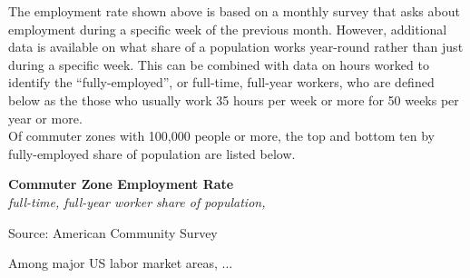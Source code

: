 \documentclass{report}
\begin{document}
{{{{\begin{minipage}{0.76\textwidth}
\vspace{4mm}

\small The employment rate shown above is based on a monthly survey that asks about employment during a specific week of the previous month. However, additional data is available on what share of a population works year-round rather than just during a specific week. This can be combined with data on hours worked to identify the ``fully-employed'', or full-time, full-year workers, who are defined below as the those who usually work 35 hours per week or more for 50 weeks per year or more.\\

 Of commuter zones with 100,000 people or more, the top and bottom ten by fully-employed share of population are listed below.
\end{minipage}

\vspace{3mm}

\begin{minipage}{0.52\textwidth}


\noindent \normalsize \textbf{Commuter Zone Employment Rate}\\
\footnotesize{\textit{full-time, full-year worker share of population, }}\\

\vspace{-3mm}

\hspace{-11mm} 

\vspace{-1mm}
\footnotesize{Source: American Community Survey}
\end{minipage} \hspace{3mm}
\begin{minipage}{0.24\textwidth}

\vspace{1mm}

\footnotesize 


\end{minipage}

\newpage

\begin{minipage}{0.76\textwidth} 

\small Among major US labor market areas, ...\\

\vspace{5mm}


\end{minipage}}}}}
\end{document}
